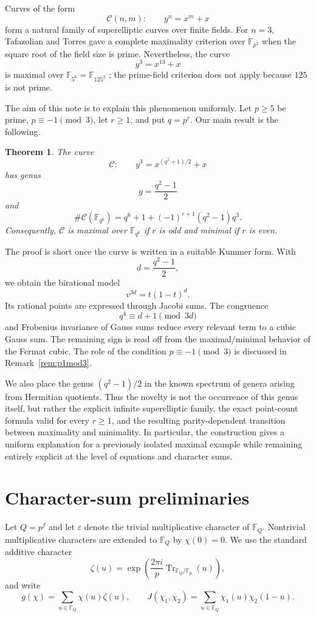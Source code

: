 \documentclass[3p,10pt]{elsarticle}
\newtheorem{theorem}{Theorem}[section]
\theoremstyle{remark}
\newcommand{\cC}{\mathcal{C}}
\newcommand{\F}{\mathbb{F}}
\newcommand{\Tr}{\operatorname{Tr}}
\begin{document}
Curves of the form
\[
\cC(n,m):\qquad y^n=x^m+x
\]
form a natural family of superelliptic curves over finite fields. For $n=3$, Tafazolian and Torres \cite{TafazolianTorres2014} gave a complete maximality criterion over $\F_{p^2}$ when the square root of the field size is prime. Nevertheless, the curve
\[
y^3=x^{13}+x
\]
is maximal over $\F_{5^6}=\F_{125^2}$ \cite[Remark~3.8]{DiasTafazolian2025}; the prime-field criterion does not apply because $125$ is not prime.

The aim of this note is to explain this phenomenon uniformly. Let $p\ge 5$ be prime, $p\equiv -1\pmod 3$, let $r\ge 1$, and put $q=p^r$. Our main result is the following.

\begin{theorem}\label{thm:main}
The curve
\[
\cC:\qquad y^3=x^{(q^2+1)/2}+x
\]
has genus
\[
g=\frac{q^2-1}{2}
\]
and
\[
\#\cC(\F_{q^6})=q^6+1+(-1)^{r+1}(q^2-1)q^3.
\]
Consequently, $\cC$ is maximal over $\F_{q^6}$ if $r$ is odd and minimal if $r$ is even.
\end{theorem}

The proof is short once the curve is written in a suitable Kummer form. With
\[
d=\frac{q^2-1}{2},
\]
we obtain the birational model
\[
v^{3d}=t(1-t)^d.
\]
Its rational points are expressed through Jacobi sums. The congruence
\[
q^4\equiv d+1\pmod{3d}
\]
and Frobenius invariance of Gauss sums reduce every relevant term to a cubic Gauss sum. The remaining sign is read off from the maximal/minimal behavior of the Fermat cubic. The role of the condition $p\equiv -1\pmod 3$ is discussed in Remark~\ref{rem:p1mod3}.

We also place the genus $(q^2-1)/2$ in the known spectrum of genera arising from Hermitian quotients. Thus the novelty is not the occurrence of this genus itself, but rather the explicit infinite superelliptic family, the exact point-count formula valid for every $r\ge 1$, and the resulting parity-dependent transition between maximality and minimality. In particular, the construction gives a uniform explanation for a previously isolated maximal example while remaining entirely explicit at the level of equations and character sums.

\section{Character-sum preliminaries}\label{sec:prelim}

Let $Q=p^f$ and let $\varepsilon$ denote the trivial multiplicative character of $\F_Q$. Nontrivial multiplicative characters are extended to $\F_Q$ by $\chi(0)=0$. We use the standard additive character
\[
\zeta(u)=\exp\!\left(\frac{2\pi i}{p}\Tr_{\F_Q/\F_p}(u)\right),
\]
and write
\[
g(\chi)=\sum_{u\in\F_Q}\chi(u)\zeta(u),
\qquad
J(\chi_1,\chi_2)=\sum_{u\in\F_Q}\chi_1(u)\chi_2(1-u).
\]
\end{document}
